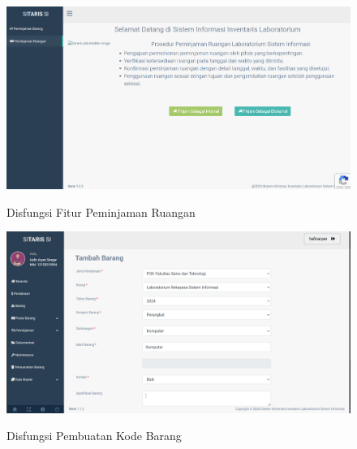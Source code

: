 \begin{figure}
	\centering
	\includegraphics[width=0.82\linewidth]{konten//gambar/observasi-peminjaman-ruangan.png}
	\caption{Disfungsi Fitur Peminjaman Ruangan} \protect\cite{sitaris}
	\label{fig:enter-label}
\end{figure}

\begin{figure}
	\centering
	\includegraphics[width=0.82\linewidth]{konten//gambar/kode-barang.png}
	\caption{Disfungsi Pembuatan Kode Barang} \protect\cite{sitaris}
	\label{fig:enter-label}
\end{figure}
